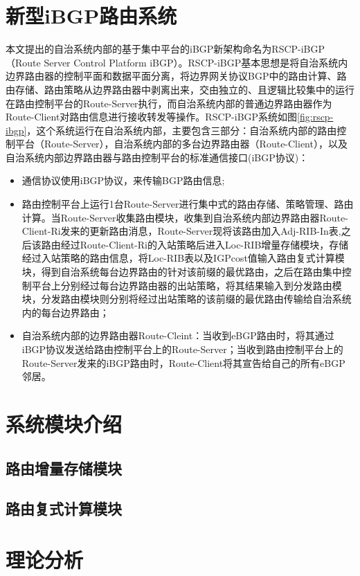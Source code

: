 \section{新型iBGP路由系统}
本文提出的自治系统内部的基于集中平台的iBGP新架构命名为RSCP-iBGP（Route Server Control Platform iBGP）。RSCP-iBGP基本思想是将自治系统内边界路由器的控制平面和数据平面分离，将边界网关协议BGP中的路由计算、路由存储、路由策略从边界路由器中剥离出来，交由独立的、且逻辑比较集中的运行在路由控制平台的Route-Server执行，而自治系统内部的普通边界路由器作为Route-Client对路由信息进行接收转发等操作。RSCP-iBGP系统如图\ref{fig:rscp-ibgp}，这个系统运行在自治系统内部，主要包含三部分：自治系统内部的路由控制平台（Route-Server），自治系统内部的多台边界路由器（Route-Client），以及自治系统内部边界路由器与路由控制平台的标准通信接口(iBGP协议)：
\begin{itemize}
  \item 通信协议使用iBGP协议，来传输BGP路由信息;
  \item 路由控制平台上运行1台Route-Server进行集中式的路由存储、策略管理、路由计算。当Route-Server收集路由模块，收集到自治系统内部边界路由器Route-Client-Ri发来的更新路由消息，Route-Server现将该路由加入Adj-RIB-In表,之后该路由经过Route-Client-Ri的入站策略后进入Loc-RIB增量存储模块，存储经过入站策略的路由信息，将Loc-RIB表以及IGPcost值输入路由复式计算模块，得到自治系统每台边界路由的针对该前缀的最优路由，之后在路由集中控制平台上分别经过每台边界路由器的出站策略，将其结果输入到分发路由模块，分发路由模块则分别将经过出站策略的该前缀的最优路由传输给自治系统内的每台边界路由；
  \item 自治系统内部的边界路由器Route-Cleint：当收到eBGP路由时，将其通过iBGP协议发送给路由控制平台上的Route-Server；当收到路由控制平台上的Route-Server发来的iBGP路由时，Route-Client将其宣告给自己的所有eBGP邻居。
\end{itemize}

\section{系统模块介绍}
\subsection{路由增量存储模块}
\subsection{路由复式计算模块}
\section{理论分析}
